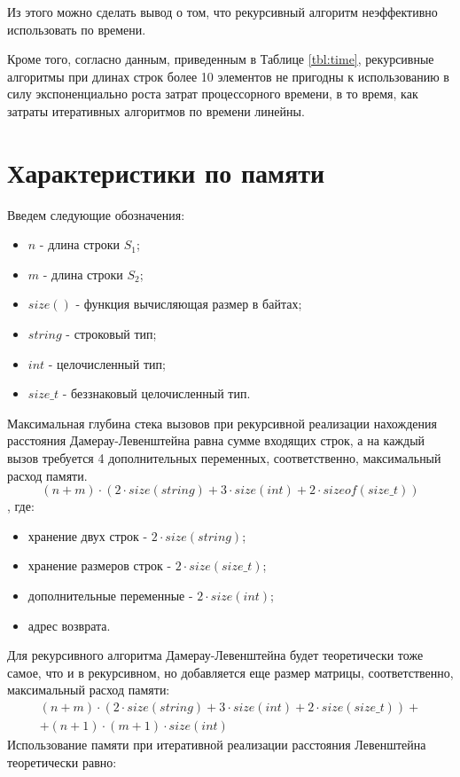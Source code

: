 Из этого можно сделать вывод о том, что рекурсивный алгоритм неэффективно использовать по времени.

Кроме того, согласно данным, приведенным в Таблице \ref{tbl:time}, рекурсивные алгоритмы при длинах строк более 10 элементов не пригодны к использованию в силу экспоненциально роста затрат процессорного времени, в то время, как затраты итеративных алгоритмов по времени линейны.

\section{Характеристики по памяти}

Введем следующие обозначения:
\begin{itemize}
	\item$n$ - длина строки $S_{1}$;
	\item$m$ - длина строки $S_{2}$;
	\item$size()$ - функция вычисляющая размер в байтах;
	\item $string$ - строковый тип;
	\item $int$ - целочисленный тип;
	\item $size\_t$ - беззнаковый целочисленный тип.
\end{itemize}

Максимальная глубина стека вызовов при рекурсивной реализации нахождения расстояния Дамерау-Левенштейна равна сумме входящих строк, а на каждый вызов требуется 4 дополнительных переменных, соответственно, максимальный расход памяти.
\begin{equation}
	(n + m) \cdot (2 \cdot size(string) + 3 \cdot size(int) + 2 \cdot sizeof(size\_t))
\end{equation}
, где:
\begin{itemize}
	\item хранение двух строк - $2 \cdot size(string)$;
	\item хранение размеров строк - $2 \cdot size(size\_t)$;
	\item дополнительные переменные - $2 \cdot size(int)$;
	\item адрес возврата.
\end{itemize}

Для рекурсивного алгоритма Дамерау-Левенштейна будет теоретически тоже самое, что и в рекурсивном, но добавляется еще размер матрицы, соответственно, максимальный расход памяти:
\begin{equation}
	\begin{aligned}
	(n + m) \cdot (2 \cdot size(string) + 3 \cdot size(int) + 2 \cdot size(size\_t)) + \\
	+ (n + 1) \cdot (m + 1) \cdot size(int)
	\end{aligned}
\end{equation}
Использование памяти при итеративной реализации расстояния Левенштейна теоретически равно:

